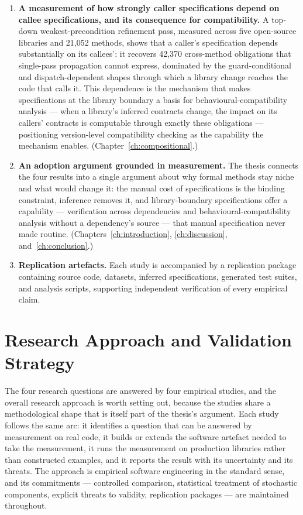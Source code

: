 \begin{enumerate}
  \item \textbf{A measurement of how strongly caller specifications depend on
        callee specifications, and its consequence for compatibility.} A
        top-down weakest-precondition refinement pass, measured across five
        open-source libraries and 21{,}052 methods, shows that a caller's
        specification depends substantially on its callees': it recovers
        42{,}370 cross-method obligations that single-pass propagation cannot
        express, dominated by the guard-conditional and dispatch-dependent
        shapes through which a library change reaches the code that calls it.
        This dependence is the mechanism that makes specifications at the
        library boundary a basis for behavioural-compatibility analysis ---
        when a library's inferred contracts change, the impact on its callers'
        contracts is computable through exactly these obligations ---
        positioning version-level compatibility checking as the capability the
        mechanism enables. (Chapter~\ref{ch:compositional}.)

  \item \textbf{An adoption argument grounded in measurement.} The thesis
        connects the four results into a single argument about why formal
        methods stay niche and what would change it: the manual cost of
        specifications is the binding constraint, inference removes it, and
        library-boundary specifications offer a capability --- verification
        across dependencies and behavioural-compatibility analysis without a
        dependency's source --- that manual specification never made routine.
        (Chapters~\ref{ch:introduction}, \ref{ch:discussion},
        and~\ref{ch:conclusion}.)

  \item \textbf{Replication artefacts.} Each study is accompanied by a
        replication package containing source code, datasets, inferred
        specifications, generated test suites, and analysis scripts,
        supporting independent verification of every empirical claim.
\end{enumerate}

\section{Research Approach and Validation Strategy}

The four research questions are answered by four empirical studies, and the
overall research approach is worth setting out, because the studies share a
methodological shape that is itself part of the thesis's argument. Each study
follows the same arc: it identifies a question that can be answered by measurement
on real code, it builds or extends the software artefact needed to take the
measurement, it runs the measurement on production libraries rather than
constructed examples, and it reports the result with its uncertainty and its
threats. The approach is empirical software engineering in the standard sense, and
its commitments --- controlled comparison, statistical treatment of stochastic
components, explicit threats to validity, replication packages --- are maintained
throughout.

